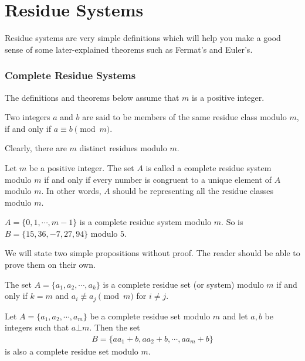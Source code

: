 \documentclass{subfile}
\begin{document}
	\section{Residue Systems}
	Residue systems are very simple definitions which will help you make a good sense of some later-explained theorems such as Fermat's and Euler's.
	\subsubsection{Complete Residue Systems}
	The definitions and theorems below assume that $m$ is a positive integer.
		\begin{definition}
			Two integers $a$ and $b$ are said to be members of the same {residue class} modulo $m$, if and only if $a \equiv b \pmod m$.
		\end{definition}

		Clearly, there are $m$ distinct residues modulo $m$.

		\begin{definition}\label{def:completeresiduesystem}
			Let $m$ be a positive integer. The set $A$ is called a {complete residue system modulo $m$} if and only if every number is congruent to a unique element of $A$ modulo $m$. In other words, $A$ should be representing all the residue classes modulo $m$.
		\end{definition}

		\begin{example}
			$A = \{0,1, \cdots, m-1\}$ is a complete residue system modulo $m$. So is $B=\{15, 36, -7, 27, 94\}$ modulo $5$.
		\end{example}
	We will state two simple propositions without proof. The reader should be able to prove them on their own.

	\begin{proposition}
		The set $A=\{a_1, a_2, \cdots, a_k\}$ is a complete residue set (or system) modulo $m$ if and only if $k=m$ and $a_i \not\equiv a_j \pmod m$ for $i \neq j$.
	\end{proposition}

	\begin{proposition} \label{prop:generalcompletesystem}
		Let $A=\{a_1, a_2, \cdots, a_m\}$ be a complete residue set modulo $m$ and let $a,b$ be integers such that $a \bot m$. Then the set
		\begin{align*}
			B=\{aa_1+b, aa_2+b, \cdots, aa_m+b\}
		\end{align*}
		is also a complete residue set modulo $m$.
	\end{proposition}
\end{document}
